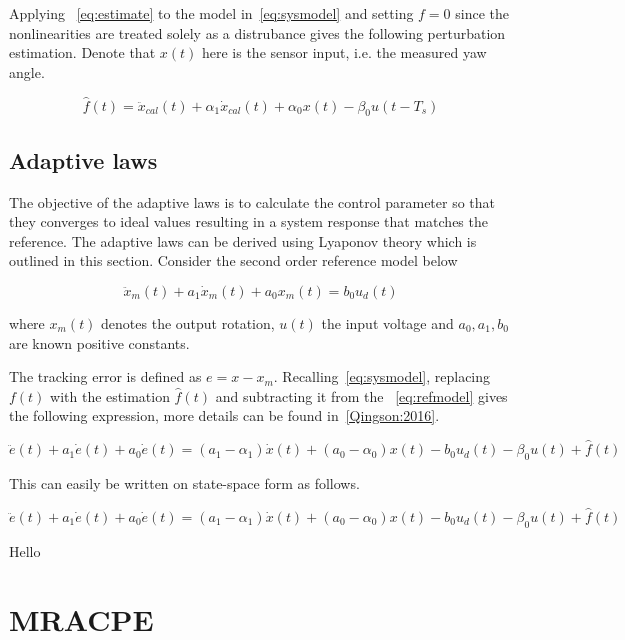 Applying ~\eqref{eq:estimate} to the model in~\eqref{eq:sysmodel} and setting $f = 0$ since the nonlinearities are treated solely as a distrubance gives the following perturbation estimation. Denote that $x(t)$ here is the sensor input, i.e. the measured yaw angle.

\begin{equation}
  \label{eq:perturbation}
  \hat{f}(t) = \ddot{x}_{cal}(t) + \alpha_1\dot{x}_{cal}(t) +  \alpha_0x(t) - \beta_0u(t-T_s)
\end{equation}

\subsection{Adaptive laws}
The objective of the adaptive laws is to calculate the control parameter so that they converges to ideal values resulting in a system response that matches the reference. The adaptive laws can be derived using Lyaponov theory which is outlined in this section. Consider the second order reference model below

\begin{equation}
  \label{eq:refmodel}
  \ddot{x}_m(t) + a_1\dot{x}_m(t) +  a_0x_m(t) = b_0u_d(t)
\end{equation}

where $x_m(t)$ denotes the output rotation, $u(t)$ the input voltage and $a_0, a_1, b_0$ are known positive constants.

The tracking error is defined as $e=x-x_m$. Recalling~\eqref{eq:sysmodel}, replacing $f(t)$ with the estimation $\hat{f}(t)$ and subtracting it from the ~\eqref{eq:refmodel} gives the following expression, more details can be found in~\ref{Qingson:2016}.

\begin{equation}
  \label{eq:refmodel}
  \ddot{e}(t) + a_1\dot{e}(t) + a_0\dot{e}(t) =  (a_1-\alpha_1)\dot{x}(t) + (a_0-\alpha_0)x(t) - b_0u_d(t) - \beta_0u(t) + \hat{f}(t)
\end{equation}

This can easily be written on state-space form as follows.

\begin{equation}
  \label{eq:refmodel}
  \ddot{e}(t) + a_1\dot{e}(t) + a_0\dot{e}(t) =  (a_1-\alpha_1)\dot{x}(t) + (a_0-\alpha_0)x(t) - b_0u_d(t) - \beta_0u(t) + \hat{f}(t)
\end{equation}

\begin{theorem}
  Hello
\end{theorem}






\begin{chapter-appendix}
  \label{ap:lyaponov}

\section{MRACPE}


\end{chapter-appendix}
